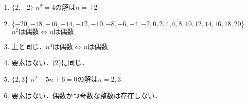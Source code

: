 \documentclass[a4paper,12pt]{ltjsarticle}
\begin{document}
\section{}
\begin{enumerate}[(1)]
    \item $\{ 2, -2 \}$ \quad $n^2 = 4$の解は$n = \pm 2$
    \item $\{ -20, -18, -16, -14, -12, -10, -8, -6, -4, -2, 0, 2, 4, 6, 8, 10, 12, 14, 16, 18, 20 \}$ \quad $n^2は偶数 \Leftrightarrow nは偶数$
    \item 上と同じ．\quad $n^4は偶数 \Leftrightarrow nは偶数$
    \item 要素はない．\quad (2)に同じ．
    \item $\{ 2, 3 \}$ \quad $n^2 - 5n + 6 = 0$の解は$n = 2, 3$
    \item 要素はない．\quad 偶数かつ奇数な整数は存在しない．
\end{enumerate}
\end{document}
